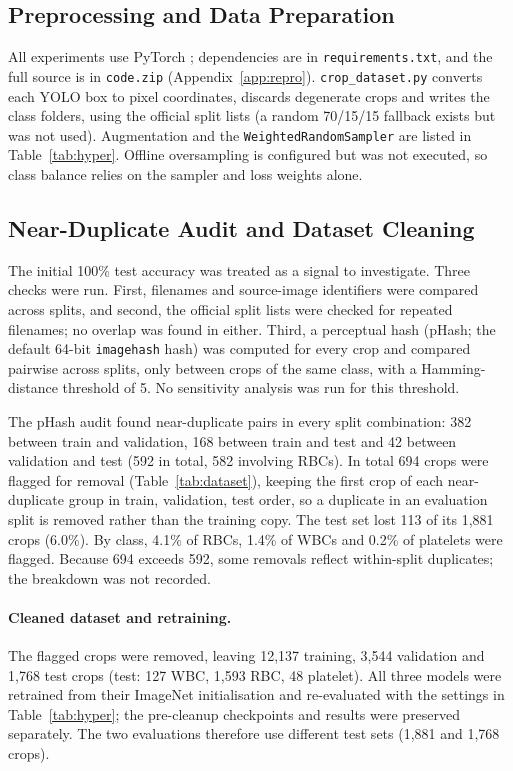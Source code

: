 \documentclass[11pt,a4paper]{article}
\begin{document}
\subsection{Preprocessing and Data Preparation}

All experiments use PyTorch \citep{paszke2019pytorch}; dependencies are in \texttt{requirements.txt}, and the full source is in \texttt{code.zip} (Appendix~\ref{app:repro}). \texttt{crop\_dataset.py} converts each YOLO box to pixel coordinates, discards degenerate crops and writes the class folders, using the official split lists (a random 70/15/15 fallback exists but was not used). Augmentation and the \texttt{WeightedRandomSampler} are listed in Table~\ref{tab:hyper}. Offline oversampling is configured but was not executed, so class balance relies on the sampler and loss weights alone.

\subsection{Near-Duplicate Audit and Dataset Cleaning}\label{sec:audit}

The initial 100\% test accuracy was treated as a signal to investigate. Three checks were run. First, filenames and source-image identifiers were compared across splits, and second, the official split lists were checked for repeated filenames; no overlap was found in either. Third, a perceptual hash (pHash; the default 64-bit \texttt{imagehash} hash) was computed for every crop and compared pairwise across splits, only between crops of the same class, with a Hamming-distance threshold of 5. No sensitivity analysis was run for this threshold.

The pHash audit found near-duplicate pairs in every split combination: 382 between train and validation, 168 between train and test and 42 between validation and test (592 in total, 582 involving RBCs). In total 694 crops were flagged for removal (Table~\ref{tab:dataset}), keeping the first crop of each near-duplicate group in train, validation, test order, so a duplicate in an evaluation split is removed rather than the training copy. The test set lost 113 of its 1,881 crops (6.0\%). By class, 4.1\% of RBCs, 1.4\% of WBCs and 0.2\% of platelets were flagged. Because 694 exceeds 592, some removals reflect within-split duplicates; the breakdown was not recorded.

\paragraph{Cleaned dataset and retraining.} The flagged crops were removed, leaving 12,137 training, 3,544 validation and 1,768 test crops (test: 127 WBC, 1,593 RBC, 48 platelet). All three models were retrained from their ImageNet initialisation and re-evaluated with the settings in Table~\ref{tab:hyper}; the pre-cleanup checkpoints and results were preserved separately. The two evaluations therefore use different test sets (1,881 and 1,768 crops).
\end{document}
